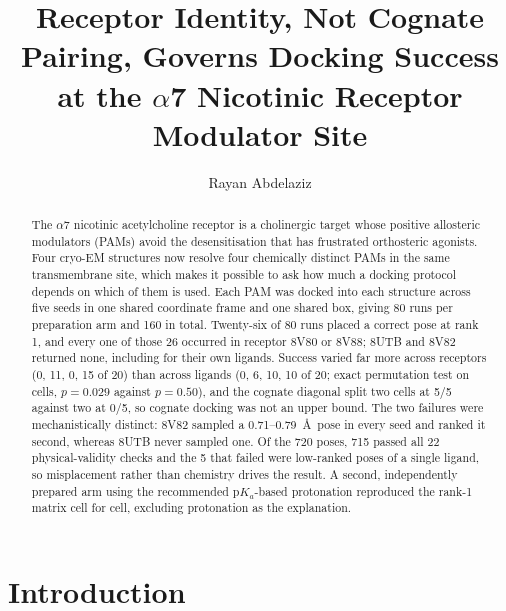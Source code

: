 \documentclass[sigconf]{acmart}
\begin{document}
\title{Receptor Identity, Not Cognate Pairing, Governs Docking Success
       at the $\alpha$7 Nicotinic Receptor Modulator Site}

\author{Rayan Abdelaziz}
\orcid{}

\begin{abstract}
The $\alpha$7 nicotinic acetylcholine receptor is a cholinergic target whose
positive allosteric modulators (PAMs) avoid the desensitisation that has
frustrated orthosteric agonists. Four cryo-EM structures now resolve four
chemically distinct PAMs in the same transmembrane site, which makes it possible
to ask how much a docking protocol depends on which of them is used. Each PAM was
docked into each structure across five seeds in one shared coordinate frame and
one shared box, giving 80 runs per preparation arm and 160 in total. Twenty-six of
80 runs placed a correct pose at rank 1, and every one of those 26 occurred in
receptor 8V80 or 8V88; 8UTB and 8V82 returned none, including for their own
ligands. Success varied far more across receptors (0, 11, 0, 15 of 20) than across
ligands (0, 6, 10, 10 of 20; exact permutation test on cells, $p = 0.029$ against
$p = 0.50$), and the cognate diagonal split two cells at 5/5
against two at 0/5, so cognate docking was not an upper bound. The two failures
were mechanistically distinct: 8V82 sampled a 0.71--0.79~\AA\ pose in every seed
and ranked it second, whereas 8UTB never sampled one. Of the 720 poses, 715 passed
all 22 physical-validity checks and the 5 that failed were low-ranked poses of a
single ligand, so misplacement rather than chemistry drives the result. A second,
independently prepared arm using the recommended p$K_a$-based protonation
reproduced the rank-1 matrix cell for cell, excluding protonation as the
explanation.
\end{abstract}


\maketitle
\fancyfoot{}
\fancyhead{}
\thispagestyle{empty}

\section{Introduction}
\label{sec:introduction}
\end{document}
